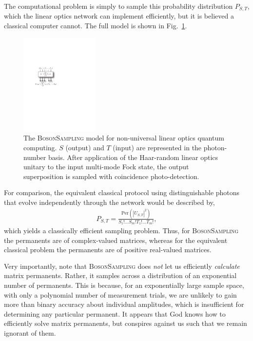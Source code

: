 The computational problem is simply to sample this probability distribution $P_{S,T}$, which the linear optics network can implement efficiently, but it is believed a classical computer cannot. The full model is shown in Fig.~\ref{fig:bs_model}.

\begin{figure}[!htbp]
\includegraphics[clip=true, width=0.35\textwidth]{BS_model}
\captionspacefig \caption{The \textsc{BosonSampling} model for non-universal linear optics quantum computing. $S$ (output) and $T$ (input) are represented in the photon-number basis. After application of the Haar-random linear optics unitary to the input multi-mode Fock state, the output superposition is sampled with coincidence photo-detection.} \label{fig:bs_model}
\end{figure}

For comparison, the equivalent classical protocol using distinguishable photons that evolve independently through the network would be described by,
\begin{align}
	P_{S,T} = \frac{\mathrm{Per}(|U_{S,T}|^2)}{S_1!\dots S_m! T_1!\dots T_m!},
\end{align}
which yields a classically efficient sampling problem. Thus, for \textsc{BosonSampling} the permanents are of complex-valued matrices, whereas for the equivalent classical problem the permanents are of positive real-valued matrices.

Very importantly, note that \textsc{BosonSampling} does \textit{not} let us efficiently \textit{calculate} matrix permanents. Rather, it samples across a distribution of an exponential number of permanents. This is because, for an exponentially large sample space, with only a polynomial number of measurement trials, we are unlikely to gain more than binary accuracy about individual amplitudes, which is insufficient for determining any particular permanent. It appears that God knows how to efficiently solve matrix permanents, but conspires against us such that we remain ignorant of them. 

